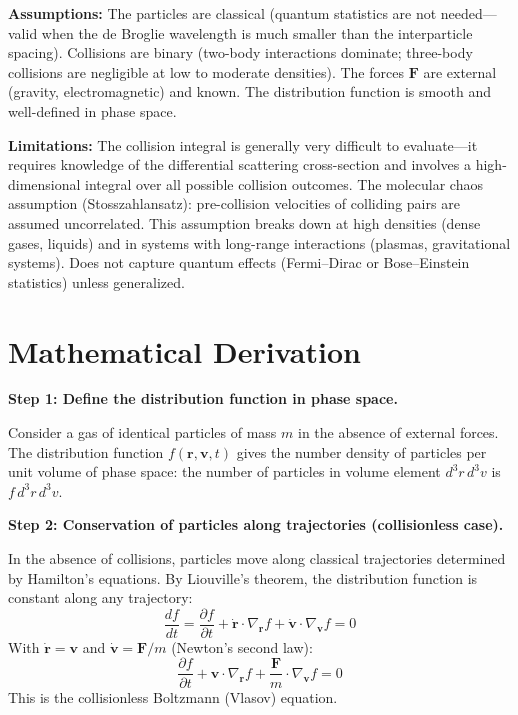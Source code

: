 \textbf{Assumptions:} The particles are classical (quantum statistics are not needed---valid when the de Broglie wavelength is much smaller than the interparticle spacing). Collisions are binary (two-body interactions dominate; three-body collisions are negligible at low to moderate densities). The forces $\mathbf{F}$ are external (gravity, electromagnetic) and known. The distribution function is smooth and well-defined in phase space.


\textbf{Limitations:} The collision integral is generally very difficult to evaluate---it requires knowledge of the differential scattering cross-section and involves a high-dimensional integral over all possible collision outcomes. The molecular chaos assumption (Stosszahlansatz): pre-collision velocities of colliding pairs are assumed uncorrelated. This assumption breaks down at high densities (dense gases, liquids) and in systems with long-range interactions (plasmas, gravitational systems). Does not capture quantum effects (Fermi--Dirac or Bose--Einstein statistics) unless generalized.


\section*{Mathematical Derivation}

\textbf{Step 1: Define the distribution function in phase space.}

Consider a gas of identical particles of mass $m$ in the absence of external forces. The distribution function $f(\mathbf{r},\mathbf{v},t)$ gives the number density of particles per unit volume of phase space: the number of particles in volume element $d^3r\,d^3v$ is $f\,d^3r\,d^3v$.

\textbf{Step 2: Conservation of particles along trajectories (collisionless case).}

In the absence of collisions, particles move along classical trajectories determined by Hamilton's equations. By Liouville's theorem, the distribution function is constant along any trajectory:
\begin{equation}
\frac{df}{dt} = \frac{\partial f}{\partial t} + \dot{\mathbf{r}}\cdot\nabla_{\mathbf{r}} f + \dot{\mathbf{v}}\cdot\nabla_{\mathbf{v}} f = 0
\end{equation}
With $\dot{\mathbf{r}} = \mathbf{v}$ and $\dot{\mathbf{v}} = \mathbf{F}/m$ (Newton's second law):
\begin{equation}
\frac{\partial f}{\partial t} + \mathbf{v}\cdot\nabla_{\mathbf{r}} f + \frac{\mathbf{F}}{m}\cdot\nabla_{\mathbf{v}} f = 0
\end{equation}
This is the collisionless Boltzmann (Vlasov) equation.

